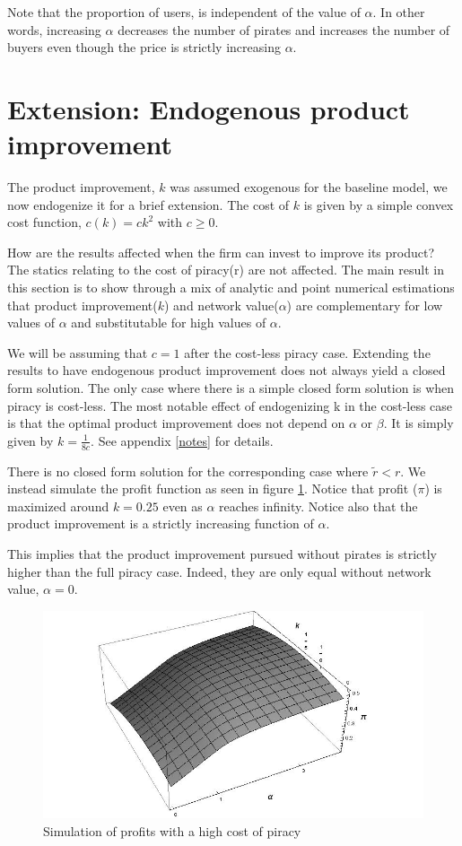 Note that the proportion of users, is independent of the value of $\alpha$. In other words, increasing $\alpha$ decreases the number of pirates and increases the number of buyers even though the price is strictly increasing $\alpha$. 


\section{Extension: Endogenous product improvement}

The product improvement, $k$ was assumed exogenous for the baseline model, we now endogenize it for a brief extension. The cost of $k$ is given by a simple convex cost function, $c(k)= ck^2$ with $c \geq 0$. 

How are the results affected when the firm can invest to improve its product? The statics relating to the cost of piracy(r) are not affected. The main result in this section is to show through a mix of analytic and point numerical estimations that product improvement($k$) and network value($\alpha$) are complementary for low values of $\alpha$ and substitutable for high values of $\alpha$.

We will be assuming that $c=1$ after the cost-less piracy case. Extending the results to have endogenous product improvement does not always yield a closed form solution. The only case where there is a simple closed form solution is when piracy is cost-less. The most notable effect of endogenizing k in the cost-less case is that the optimal product improvement does not depend on $\alpha$ or $\beta$. It is simply given by $k=\frac{1}{8c}$. See appendix \ref{notes} for details.

There is no closed form solution for the corresponding case where $\tilde{r}<r$. We instead simulate the profit function as seen in figure \ref{endk1}. Notice that profit ($\pi$) is maximized around $k=0.25$ even as $\alpha$ reaches infinity. Notice also that the product improvement is a strictly increasing function of $\alpha$.

This implies that the product improvement pursued without pirates is strictly higher than the full piracy case. Indeed, they are only equal without network value, $\alpha=0$. 

\begin{figure}[h!] 
\centering
\includegraphics[width=1.0\textwidth]{./figures/Endogenousksimulation0.jpg}
\caption{Simulation of profits with a high cost of piracy }
\label{endk1}
\end{figure}

